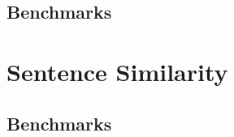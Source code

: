 \documentclass[fullname]{clv2}
\begin{document}
\subsection{Benchmarks}

\begin{enumerate*}
\item \cite{mitchell2010composition}
\end{enumerate*}



\section{Sentence Similarity}

\begin{enumerate*}
\item \cite{allison1986bit}
\item \cite{wise1996yap3}
\item \cite{kevselj2003n}
\item \cite{croce2011structured}
\item \cite{Agirreetal:2012}
\item \cite{Agirreetal:2013}
\item \cite{UKP:STS12}
\item \cite{DBLP:conf/spire/2010}
\item \cite{bar2013dkpro}
\item \cite{sultan-bethard-sumner:2014:SemEval}
\item \cite{sultan-bethard-sumner:2015:SemEval}
\item \cite{kiros2015skip}
\item \cite{kenter15short}
\end{enumerate*}

\subsection{Benchmarks}
\begin{enumerate*}
\item \cite{dolan2004unsupervised}
\item \cite{li2006sentence}
\item \cite{Agirreetal:2012}
\item \cite{Agirre:2013}
\item \cite{agirreetal:2014}
\item \cite{agirre2015semeval}

\end{enumerate*}
\end{document}
